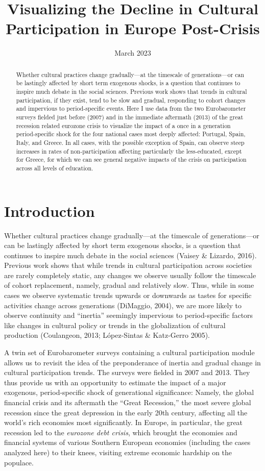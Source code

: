 \documentclass{article}
\title{Visualizing the Decline in Cultural Participation in Europe Post-Crisis}
\date{March 2023}
\begin{document}
\maketitle

\begin{abstract}
    Whether cultural practices change gradually---at the timescale of generations---or can be lastingly affected by short term exogenous shocks, is a question that continues to inspire much debate in the social sciences. Previous work shows that trends in cultural participation, if they exist, tend to be slow and gradual, responding to cohort changes and impervious to period-specific events. Here I use data from the two Eurobarometer surveys fielded just before (2007) and in the immediate aftermath (2013) of the great recession related eurozone crisis to visualize the impact of a once in a generation period-specific shock for the four national cases most deeply affected: Portugal, Spain, Italy, and Greece. In all cases, with the possible exception of Spain, can observe steep increases in rates of non-participation affecting particularly the less-educated, except for Greece, for which we can see general negative impacts of the crisis on participation across all levels of education. \end{abstract}

\section{Introduction}
Whether cultural practices change gradually---at the timescale of generations---or can be lastingly affected by short term exogenous shocks, is a question that continues to inspire much debate in the social sciences (Vaisey \& Lizardo, 2016). Previous work shows that while trends in cultural participation across societies are rarely completely static, any changes we observe usually follow the timescale of cohort replacement, namely, gradual and relatively slow. Thus, while in some cases we observe systematic trends upwards or downwards as tastes for specific activities change across generations (DiMaggio, 2004), we are more likely to observe continuity and ``inertia'' seemingly impervious to period-specific factors like changes in cultural policy or trends in the globalization of cultural production (Coulangeon, 2013; López-Sintas \& Katz-Gerro 2005).

A twin set of Eurobarometer surveys containing a cultural participation module allows us to revisit the idea of the preponderance of inertia and gradual change in cultural participation trends. The surveys were fielded in 2007 and 2013. They thus provide us with an opportunity to estimate the impact of a major exogenous, period-specific shock of generational significance: Namely, the global financial crisis and its aftermath the ``Great Recession,'' the most severe global recession since the great depression in the early 20th century,  affecting all the world's rich economies most significantly. In Europe, in particular, the great recession led to the {\em eurozone debt crisis}, which brought the economies and financial systems of various Southern European economies (including the cases analyzed here) to their knees, visiting extreme economic hardship on the populace.
\end{document}
